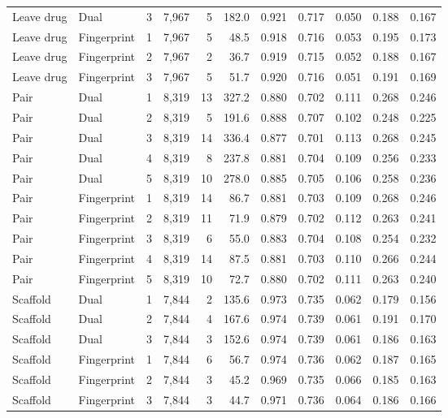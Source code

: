 \begin{landscape}
\begin{longtable}{@{}llrrrrrrrrr@{}}
Leave drug & Dual & 3 & 7,967 & 5 & 182.0 & 0.921 & 0.717 & 0.050 & 0.188 & 0.167 \\
Leave drug & Fingerprint & 1 & 7,967 & 5 & 48.5 & 0.918 & 0.716 & 0.053 & 0.195 & 0.173 \\
Leave drug & Fingerprint & 2 & 7,967 & 2 & 36.7 & 0.919 & 0.715 & 0.052 & 0.188 & 0.167 \\
Leave drug & Fingerprint & 3 & 7,967 & 5 & 51.7 & 0.920 & 0.716 & 0.051 & 0.191 & 0.169 \\
Pair & Dual & 1 & 8,319 & 13 & 327.2 & 0.880 & 0.702 & 0.111 & 0.268 & 0.246 \\
Pair & Dual & 2 & 8,319 & 5 & 191.6 & 0.888 & 0.707 & 0.102 & 0.248 & 0.225 \\
Pair & Dual & 3 & 8,319 & 14 & 336.4 & 0.877 & 0.701 & 0.113 & 0.268 & 0.245 \\
Pair & Dual & 4 & 8,319 & 8 & 237.8 & 0.881 & 0.704 & 0.109 & 0.256 & 0.233 \\
Pair & Dual & 5 & 8,319 & 10 & 278.0 & 0.885 & 0.705 & 0.106 & 0.258 & 0.236 \\
Pair & Fingerprint & 1 & 8,319 & 14 & 86.7 & 0.881 & 0.703 & 0.109 & 0.268 & 0.246 \\
Pair & Fingerprint & 2 & 8,319 & 11 & 71.9 & 0.879 & 0.702 & 0.112 & 0.263 & 0.241 \\
Pair & Fingerprint & 3 & 8,319 & 6 & 55.0 & 0.883 & 0.704 & 0.108 & 0.254 & 0.232 \\
Pair & Fingerprint & 4 & 8,319 & 14 & 87.5 & 0.881 & 0.703 & 0.110 & 0.266 & 0.244 \\
Pair & Fingerprint & 5 & 8,319 & 10 & 72.7 & 0.880 & 0.702 & 0.111 & 0.263 & 0.240 \\
Scaffold & Dual & 1 & 7,844 & 2 & 135.6 & 0.973 & 0.735 & 0.062 & 0.179 & 0.156 \\
Scaffold & Dual & 2 & 7,844 & 4 & 167.6 & 0.974 & 0.739 & 0.061 & 0.191 & 0.170 \\
Scaffold & Dual & 3 & 7,844 & 3 & 152.6 & 0.974 & 0.739 & 0.061 & 0.186 & 0.163 \\
Scaffold & Fingerprint & 1 & 7,844 & 6 & 56.7 & 0.974 & 0.736 & 0.062 & 0.187 & 0.165 \\
Scaffold & Fingerprint & 2 & 7,844 & 3 & 45.2 & 0.969 & 0.735 & 0.066 & 0.185 & 0.163 \\
Scaffold & Fingerprint & 3 & 7,844 & 3 & 44.7 & 0.971 & 0.736 & 0.064 & 0.186 & 0.166 \\
\end{longtable}
\endgroup
\end{landscape}
